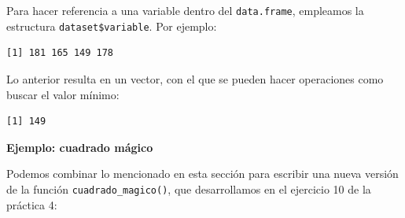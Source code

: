 \documentclass[
]{book}
\newenvironment{Shaded}{\begin{snugshade}}{\end{snugshade}}
\newcommand{\FunctionTok}[1]{\textcolor[rgb]{0.00,0.00,0.00}{#1}}
\newcommand{\NormalTok}[1]{#1}
\newcommand{\SpecialCharTok}[1]{\textcolor[rgb]{0.00,0.00,0.00}{#1}}
\begin{document}
Para hacer referencia a una variable dentro del \texttt{data.frame}, empleamos la estructura \texttt{dataset\$variable}. Por ejemplo:

\begin{Shaded}
\end{Shaded}

\begin{verbatim}
[1] 181 165 149 178
\end{verbatim}

Lo anterior resulta en un vector, con el que se pueden hacer operaciones como buscar el valor mínimo:

\begin{Shaded}
\end{Shaded}

\begin{verbatim}
[1] 149
\end{verbatim}

\textbf{Ejemplo: cuadrado mágico}

Podemos combinar lo mencionado en esta sección para escribir una nueva versión de la función \texttt{cuadrado\_magico()}, que desarrollamos en el ejercicio 10 de la práctica 4:
\end{document}
